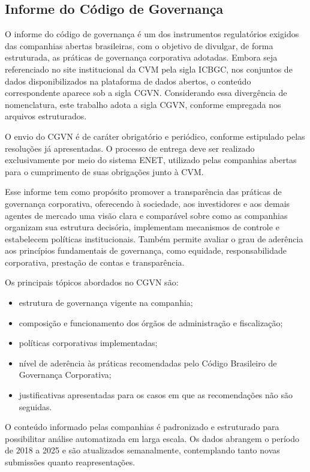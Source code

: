 \subsection{Informe do Código de Governança}

O informe do código de governança é um dos instrumentos regulatórios exigidos das companhias abertas brasileiras, com o objetivo de divulgar, de forma estruturada, as práticas de governança corporativa adotadas. Embora seja referenciado no site institucional da CVM pela sigla ICBGC, nos conjuntos de dados disponibilizados na plataforma de dados abertos, o conteúdo correspondente aparece sob a sigla CGVN. Considerando essa divergência de nomenclatura, este trabalho adota a sigla CGVN, conforme empregada nos arquivos estruturados.

O envio do CGVN é de caráter obrigatório e periódico, conforme estipulado pelas resoluções já apresentadas. O processo de entrega deve ser realizado exclusivamente por meio do sistema ENET, utilizado pelas companhias abertas para o cumprimento de suas obrigações junto à CVM.

Esse informe tem como propósito promover a transparência das práticas de governança corporativa, oferecendo à sociedade, aos investidores e aos demais agentes de mercado uma visão clara e comparável sobre como as companhias organizam sua estrutura decisória, implementam mecanismos de controle e estabelecem políticas institucionais. Também permite avaliar o grau de aderência aos princípios fundamentais de governança, como equidade, responsabilidade corporativa, prestação de contas e transparência.

Os principais tópicos abordados no CGVN são:

\begin{itemize}
	\item estrutura de governança vigente na companhia;
	\item composição e funcionamento dos órgãos de administração e fiscalização;
	\item políticas corporativas implementadas;
	\item nível de aderência às práticas recomendadas pelo Código Brasileiro de Governança Corporativa;
	\item justificativas apresentadas para os casos em que as recomendações não são seguidas.
\end{itemize}

O conteúdo informado pelas companhias é padronizado e estruturado para possibilitar análise automatizada em larga escala. Os dados abrangem o período de 2018 a 2025 e são atualizados semanalmente, contemplando tanto novas submissões quanto reapresentações.

